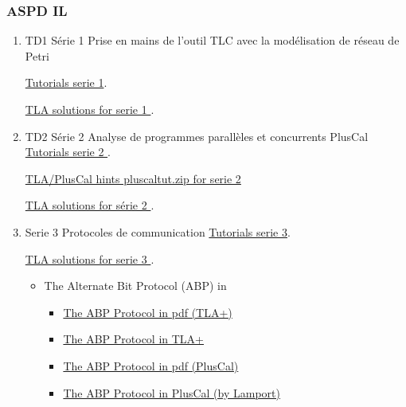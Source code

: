 \documentclass[ 12pt]{article}
\begin{document}
  \subsubsection{ASPD IL}
\label{sec:aspd}


\begin{enumerate}



  \item[*] TD1   S\'erie  1  Prise en mains de l'outil TLC avec  la
    modélisation de réseau de Petri
    
    \href{http://mery54.github.io/teaching/aspd/lecturesnotes/aspd-il26-td1.pdf}{Tutorials 
      serie 1}.

      \href{http://mery54.github.io/teaching/aspd/models/tlailtd1.zip}{TLA 
           solutions for serie 1 
         }.

\item[*] TD2   S\'erie 2  Analyse de  programmes parallèles et concurrents PlusCal
    \href{http://mery54.github.io/teaching/aspd/lecturesnotes/aspd-il26-td2.pdf}{Tutorials 
      serie 2 }.
    
\href{http://mery54.github.io/teaching/aspd/models/pluscaltut.zip}{TLA/PlusCal
  hints  pluscaltut.zip for serie 2}
    
        \href{http://mery54.github.io/teaching/aspd/models/tlailtd2.zip}{TLA 
           solutions for s\'erie 2         }.
         

         
\item[TD3]   Serie  3  Protocoles de communication
    \href{http://mery54.github.io/teaching/aspd/lecturesnotes/aspd-il26-td3.pdf}{Tutorials 
      serie 3}.

        \href{http://mery54.github.io/teaching/aspd/models/tlailtd3.zip}{TLA 
           solutions for serie 3
         }.
         \begin{itemize}
         \item  The Alternate Bit Protocol  (ABP) in 
         \begin{itemize}
         \item 
           \href{http://mery54.github.io/teaching/aspd/models/a_abp.pdf}{The 
             ABP Protocol in pdf (TLA+)  }
   \item 
           \href{http://mery54.github.io/teaching/aspd/models/a_abp.tla}{The 
             ABP  Protocol in TLA+}
                    \item 
           \href{http://mery54.github.io/teaching/aspd/models/a_pluscal_abp.pdf}{The 
             ABP Protocol in pdf (PlusCal)}
   \item 
           \href{http://mery54.github.io/teaching/aspd/models/a_pluscal_abp.tla}{The 
           ABP Protocol in PlusCal (by Lamport)}          
       \end{itemize}


\end{itemize}
\end{enumerate}
\end{document}
